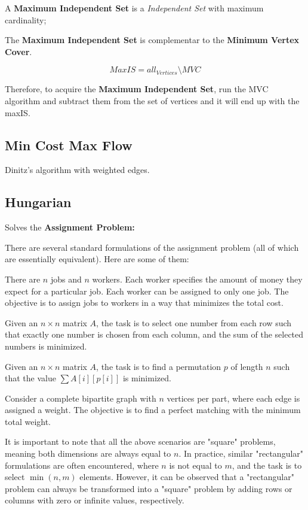 		A \textbf{Maximum Independent Set} is a \textit{Independent Set} with maximum cardinality;

		The \textbf{Maximum Independent Set} is complementar to the \textbf{Minimum Vertex Cover}.

		$$ MaxIS = all_{Vertices} \setminus MVC $$

		Therefore, to acquire the \textbf{Maximum Independent Set}, run the MVC algorithm and subtract them from the set of vertices and it will end up with the maxIS.

	\subsection{Min Cost Max Flow}

		Dinitz's algorithm with weighted edges.


	\subsection{Hungarian}

		Solves the \textbf{Assignment Problem:}

		There are several standard formulations of the assignment problem (all of which are essentially equivalent). Here are some of them:

		There are $n$ jobs and $n$ workers. Each worker specifies the amount of money they expect for a particular job.
		Each worker can be assigned to only one job. The objective is to assign jobs to workers in a way that minimizes the total cost.

		Given an $n \times n$ matrix $A$, the task is to select one number from each row such that exactly 
		one number is chosen from each column, and the sum of the selected numbers is minimized.

		Given an $n \times n$ matrix $A$, the task is to find a permutation $p$ of length $n$ such that the value
		$\sum A[i]\left[p[i]\right]$ is minimized.

		Consider a complete bipartite graph with $n$ vertices per part, where each edge is assigned a weight.
		The objective is to find a perfect matching with the minimum total weight.

		It is important to note that all the above scenarios are "square" problems, meaning both dimensions are always equal to
		$n$. In practice, similar "rectangular" formulations are often encountered, where $n$ is not equal to 
		$m$, and the task is to select $\min(n,m)$ elements. However, it can be observed that a "rectangular" 
		problem can always be transformed into a "square" problem by adding rows or columns with zero or infinite values, respectively.

